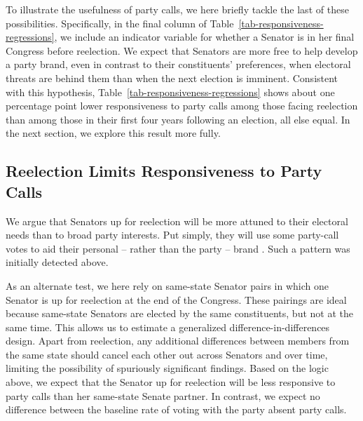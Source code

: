 \documentclass[12pt]{article}
\begin{document}
To illustrate the usefulness of party calls, we here briefly tackle the last of these possibilities. Specifically, in the final column of Table~\ref{tab-responsiveness-regressions}, we include an indicator variable for whether a Senator is in her final Congress before reelection. We expect that Senators are more free to help develop a party brand, even in contrast to their constituents' preferences, when electoral threats are behind them than when the next election is imminent. Consistent with this hypothesis, Table~\ref{tab-responsiveness-regressions} shows about one percentage point lower responsiveness to party calls among those facing reelection than among those in their first four years following an election, all else equal. In the next section, we explore this result more fully.

\subsection*{Reelection Limits Responsiveness to Party Calls}

We argue that Senators up for reelection will be more attuned to their electoral needs than to broad party interests. Put simply, they will use some party-call votes to aid their personal -- rather than the party -- brand
\citep[e.g.,][]{Canes-Wrone:2002, Carson:2010}.  Such a pattern was initially detected above.

As an alternate test, we here rely on same-state Senator pairs in which one Senator is up for reelection at the end of the Congress. These pairings are ideal because same-state Senators are elected by the same constituents, but not at the same time. This allows us to estimate a generalized difference-in-differences design. Apart from reelection, any additional differences between members from the same state should cancel each other out across Senators and over time, limiting the possibility of spuriously significant findings. Based on the logic above, we expect that the Senator up for reelection will be less responsive to party calls than her same-state Senate partner. In contrast, we expect no difference between the baseline rate of voting with the party absent party calls.
\end{document}

